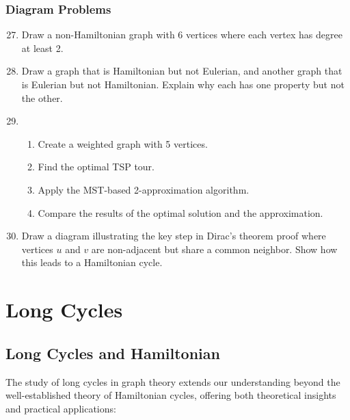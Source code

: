 \documentclass{article}
\theoremstyle{definition}
\begin{document}
\subsubsection{Diagram Problems}
\begin{enumerate}\setcounter{enumi}{26}
\item Draw a non-Hamiltonian graph with 6 vertices where each vertex has degree at least 2.

\item Draw a graph that is Hamiltonian but not Eulerian, and another graph that is Eulerian but not Hamiltonian. Explain why each has one property but not the other.

\item 
\begin{enumerate}
\item Create a weighted graph with 5 vertices.
\item Find the optimal TSP tour.
\item Apply the MST-based 2-approximation algorithm.
\item Compare the results of the optimal solution and the approximation.
\end{enumerate}

\item Draw a diagram illustrating the key step in Dirac's theorem proof where vertices $u$ and $v$ are non-adjacent but share a common neighbor. Show how this leads to a Hamiltonian cycle.
\end{enumerate}

\pagebreak


\section{Long Cycles}

\subsection{Long Cycles and Hamiltonian}


The study of long cycles in graph theory extends our understanding beyond the well-established theory of Hamiltonian cycles, offering both theoretical insights and practical applications:
\end{document}
